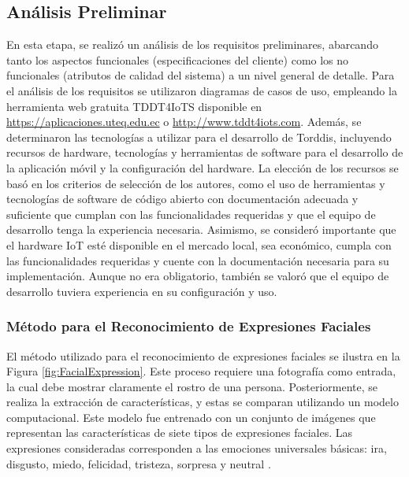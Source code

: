 \documentclass[a4paper,fleqn]{cas-sc}
\begin{document}
	\subsection{Análisis Preliminar}
	En esta etapa, se realizó un análisis de los requisitos preliminares, abarcando tanto los aspectos funcionales (especificaciones del cliente) como los no funcionales (atributos de calidad del sistema) a un nivel general de detalle. Para el análisis de los requisitos se utilizaron diagramas de casos de uso, empleando la herramienta web gratuita TDDT4IoTS disponible en \href{https://aplicaciones.uteq.edu.ec}{https://aplicaciones.uteq.edu.ec} o \href{http://www.tddt4iots.com}{http://www.tddt4iots.com}. Además, se determinaron las tecnologías a utilizar para el desarrollo de Torddis, incluyendo recursos de hardware, tecnologías y herramientas de software para el desarrollo de la aplicación móvil y la configuración del hardware. La elección de los recursos se basó en los criterios de selección de los autores, como el uso de herramientas y tecnologías de software de código abierto con documentación adecuada y suficiente que cumplan con las funcionalidades requeridas y que el equipo de desarrollo tenga la experiencia necesaria. Asimismo, se consideró importante que el hardware IoT esté disponible en el mercado local, sea económico, cumpla con las funcionalidades requeridas y cuente con la documentación necesaria para su implementación. Aunque no era obligatorio, también se valoró que el equipo de desarrollo tuviera experiencia en su configuración y uso.
	
	\subsubsection{Método para el Reconocimiento de Expresiones Faciales}
	El método utilizado para el reconocimiento de expresiones faciales se ilustra en la Figura \ref{fig:FacialExpression}. Este proceso requiere una fotografía como entrada, la cual debe mostrar claramente el rostro de una persona. Posteriormente, se realiza la extracción de características, y estas se comparan utilizando un modelo computacional. Este modelo fue entrenado con un conjunto de imágenes que representan las características de siete tipos de expresiones faciales. Las expresiones consideradas corresponden a las emociones universales básicas: ira, disgusto, miedo, felicidad, tristeza, sorpresa y neutral \citep{Zhang2022}.
	
\end{document}
